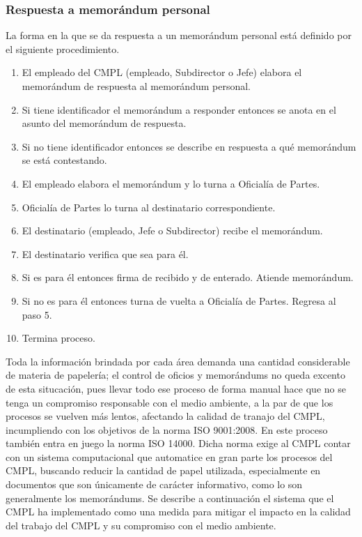 	\subsubsection{Respuesta a memorándum personal}
	La forma en la que se da respuesta a un memorándum personal está definido por el siguiente procedimiento.
	
	\begin{enumerate}
		\item El empleado del CMPL (empleado, Subdirector o Jefe) elabora el memorándum de respuesta al memorándum personal.
		\item Si tiene identificador el memorándum a responder entonces se anota en el asunto del memorándum de respuesta.
		\item Si no tiene identificador entonces se describe en respuesta a qué memorándum se está contestando.
		\item El empleado elabora el memorándum y lo turna a Oficialía de Partes.
		\item Oficialía de Partes lo turna al destinatario correspondiente.
		\item El destinatario (empleado, Jefe o Subdirector) recibe el memorándum.
		\item El destinatario verifica que sea para él.
		\item Si es para él entonces firma de recibido y de enterado. Atiende memorándum.
		\item Si no es para él entonces turna de vuelta a Oficialía de Partes. Regresa al paso 5.
		\item Termina proceso.
	\end{enumerate}
	
	Toda la información brindada por cada área demanda una cantidad considerable de materia de papelería; el control de oficios y memorándums no queda excento de esta situcación, pues llevar todo ese proceso de forma manual hace que no se tenga un compromiso responsable con el medio ambiente, a la par de que los procesos se vuelven más lentos, afectando la calidad de tranajo del CMPL, incumpliendo con los objetivos de la norma ISO 9001:2008.  En este proceso también entra en juego la norma ISO 14000. Dicha norma exige al CMPL contar con un sistema computacional que automatice en gran parte los procesos del CMPL, buscando reducir la cantidad de papel utilizada, especialmente en documentos que son únicamente de carácter informativo, como lo son generalmente los memorándums. Se describe a continuación el sistema que el CMPL ha implementado como una medida para mitigar el impacto en la calidad del trabajo del CMPL y su compromiso con el medio ambiente.\\
	
